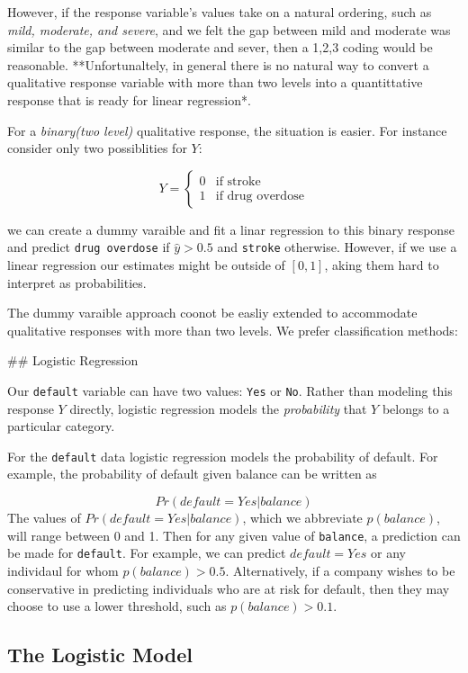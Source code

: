 \documentclass[
  letterpaper,
  DIV=11,
  numbers=noendperiod]{scrreprt}
\begin{document}
However, if the response variable's values take on a natural ordering,
such as \emph{mild, moderate, and severe}, and we felt the gap between
mild and moderate was similar to the gap between moderate and sever,
then a 1,2,3 coding would be reasonable. **Unfortunaltely, in general
there is no natural way to convert a qualitative response variable with
more than two levels into a quantittative response that is ready for
linear regression*.

For a \emph{binary(two level)} qualitative response, the situation is
easier. For instance consider only two possiblities for \(Y\):

\[
 Y = 
 \begin{cases}
 0 & \text{if stroke} \\
 1 & \text{if drug overdose}
 \end{cases}
 \]

we can create a dummy varaible and fit a linar regression to this binary
response and predict \texttt{drug\ overdose} if \(\hat{y}>0.5\) and
\texttt{stroke} otherwise. However, if we use a linear regression our
estimates might be outside of \([0,1]\), aking them hard to interpret as
probabilities.

The dummy varaible approach coonot be easliy extended to accommodate
qualitative responses with more than two levels. We prefer
classification methods:

\#\# Logistic Regression

Our \texttt{default} variable can have two values: \texttt{Yes} or
\texttt{No}. Rather than modeling this response \(Y\) directly, logistic
regression models the \emph{probability} that \(Y\) belongs to a
particular category.

For the \texttt{default} data logistic regression models the probability
of default. For example, the probability of default given balance can be
written as

\[
Pr(default = Yes | balance)
\] The values of \(Pr(default = Yes|balance)\), which we abbreviate
\(p(balance)\), will range between 0 and 1. Then for any given value of
\texttt{balance}, a prediction can be made for \texttt{default}. For
example, we can predict \(default = Yes\) or any individaul for whom
\(p(balance)>0.5\). Alternatively, if a company wishes to be
conservative in predicting individuals who are at risk for default, then
they may choose to use a lower threshold, such as \(p(balance)>0.1\).

\hypertarget{the-logistic-model}{%
\subsection{The Logistic Model}\label{the-logistic-model}}
\end{document}
